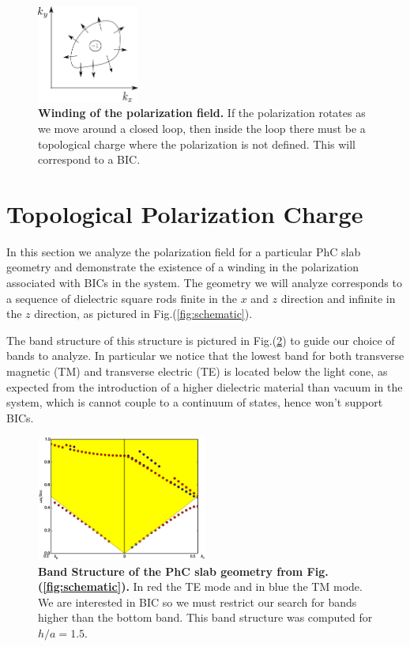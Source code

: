 \begin{figure}
  \centering
\includegraphics[width=0.3\textwidth]{Figures/polarization.png}
\caption{{\bf Winding of the polarization field.} If the polarization rotates as we move around a closed loop, then inside the loop there must be a topological charge where the polarization is not defined. This will correspond to a BIC.}
\label{fig:polarization}
\end{figure}

\section{Topological Polarization Charge}

In this section we analyze the polarization field for a particular PhC slab geometry and demonstrate the existence of a winding in the polarization associated with BICs in the system. The geometry we will analyze corresponds to a sequence of dielectric square rods finite in the $x$ and $z$ direction and infinite in the $z$ direction, as pictured in Fig.(\ref{fig:schematic}).

The band structure of this structure is pictured in Fig.(\ref{fig:Band}) to guide our choice of bands to analyze. In particular we notice that the lowest band for both transverse magnetic (TM) and transverse electric (TE) is located below the light cone, as expected from the introduction of a higher dielectric material than vacuum in the system, which is cannot couple to a continuum of states, hence won't support BICs.

\begin{figure}
\centering
\includegraphics[width=0.5\textwidth]{Figures/BandDiagram.eps}
  \caption{{\bf Band Structure of the PhC slab geometry from Fig.(\ref{fig:schematic}).} In red the TE mode and in blue the TM mode. We are interested in BIC so we must restrict our search for bands higher than the bottom band. This band structure was computed for $h/a = 1.5$.}
  \label{fig:Band}
\end{figure}



